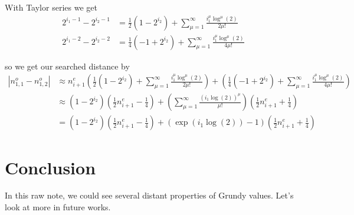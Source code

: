 \documentclass[12pt]{../document-templates/papers/one-column-mydashie/mydashie}
\newtheorem*{theorem A}{Theorem A}
\newtheorem*{theorem B}{N\"olker's Theorem}
\theoremstyle{remark}
\theoremstyle{remark}
\begin{document}
With Taylor series we get
\begin{equation}
    \begin{split}
        2^{i_{1} - 1} - 2^{i_{2} - 1} &= \frac{1}{2}\left(1 - 2^{i_{2}}\right) + \sum_{\mu = 1}^{\infty} \frac{i_{1}^{\mu}\log^{\mu}\left(2\right)}{2\mu!}\\
        2^{i_{1} - 2} - 2^{i_{2} - 2} &= \frac{1}{4}\left(-1 + 2^{i_{2}}\right) + \sum_{\mu = 1}^{\infty} \frac{i_{1}^{\mu}\log^{\mu}\left(2\right)}{4\mu!}
    \end{split}
\label{eq:taylor}
\end{equation}

so we get our searched distance by
\begin{equation}
    \begin{split}
        |n_{1,1}^{o} - n_{1,2}^{o}| &\approx n_{i+1}^{e}\left(\frac{1}{2}\left(1 - 2^{i_{2}}\right) + \sum_{\mu = 1}^{\infty} \frac{i_{1}^{\mu}\log^{\mu}\left(2\right)}{2\mu!}\right) + \left(\frac{1}{4}\left(-1 + 2^{i_{2}}\right) + \sum_{\mu = 1}^{\infty} \frac{i_{1}^{\mu}\log^{\mu}\left(2\right)}{4\mu!}\right)\\
            &\approx \left(1-2^{i_{2}}\right)\left(\frac{1}{2}n_{i+1}^{e} - \frac{1}{4}\right) + \left(\sum_{\mu = 1}^{\infty}\frac{\left(i_{1}\log\left(2\right)\right)^{\mu}}{\mu!}\right)\left(\frac{1}{2}n_{i+1}^{e} + \frac{1}{4}\right)\\
            &= \left(1 - 2^{i_{2}}\right)\left(\frac{1}{2}n_{i+1}^{e} - \frac{1}{4}\right) + \left(\exp\left(i_{1}\log\left(2\right)\right) - 1\right)\left(\frac{1}{2}n_{i+1}^{e} + \frac{1}{4}\right)
    \end{split}
\label{eq:samenumberapp_p2}
\end{equation}
\section{Conclusion}
\label{s:conclusion}
In this raw note, we could see several distant properties of Grundy values. Let's look at more in future works.
\end{document}
